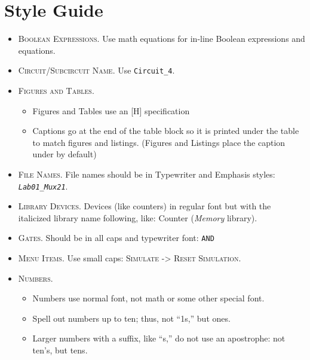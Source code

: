 \chapter*{Style Guide}
\thispagestyle{empty}

\begin{itemize}

  \item \textsc{Boolean Expressions}. Use math equations for in-line Boolean expressions and equations.

	\item \textsc{Circuit/Subcircuit Name}. Use  \lstinline[columns=fixed]|Circuit_4|.

  \item \textsc{Figures and Tables}.
  
  \begin{itemize}
    \item Figures and Tables use an [H] specification
    \item Captions go at the end of the table block so it is printed under the table to match figures and listings. (Figures and Listings place the caption under by default)
  \end{itemize}

  \item \textsc{File Names}. File names should be in Typewriter and Emphasis styles: \emph{\texttt{Lab01\_Mux21}}.

	\item \textsc{Library Devices}. Devices (like counters) in regular font but with the italicized library name following, like: Counter (\textit{Memory} library).

	\item \textsc{Gates}. Should be in all caps and typewriter font: \texttt{AND}
  
  \item \textsc{Menu Items}. Use small caps: \textsc{Simulate -> Reset Simulation}.  

  \item \textsc{Numbers}. 

	\begin{itemize}
		\item Numbers use normal font, not math or some other special font.
		\item Spell out numbers up to ten; thus, not ``1s,'' but ones.
		\item Larger numbers with a suffix, like ``s,'' do not use an apostrophe: not ten's, but tens.
	\end{itemize}


\end{itemize}
